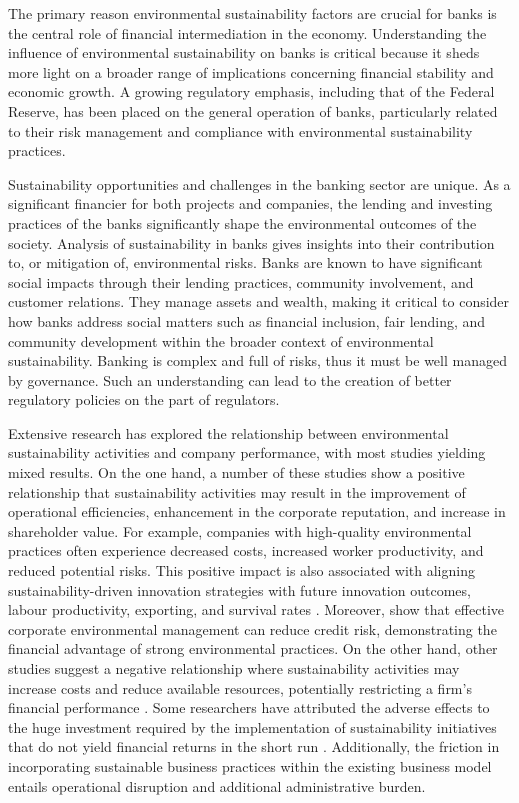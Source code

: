 \documentclass[11pt, a4paper]{article}
\begin{document}
The primary reason environmental sustainability factors are crucial for banks is the central role of financial intermediation in the economy. Understanding the influence of environmental sustainability on banks is critical because it sheds more light on a broader range of implications concerning financial stability and economic growth. A growing regulatory emphasis, including that of the Federal Reserve, has been placed on the general operation of banks, particularly related to their risk management and compliance with environmental sustainability practices.

Sustainability opportunities and challenges in the banking sector are unique. As a significant financier for both projects and companies, the lending and investing practices of the banks significantly shape the environmental outcomes of the society. Analysis of sustainability in banks gives insights into their contribution to, or mitigation of, environmental risks. Banks are known to have significant social impacts through their lending practices, community involvement, and customer relations. They manage assets and wealth, making it critical to consider how banks address social matters such as financial inclusion, fair lending, and community development within the broader context of environmental sustainability. Banking is complex and full of risks, thus it must be well managed by governance. Such an understanding can lead to the creation of better regulatory policies on the part of regulators.

Extensive research has explored the relationship between environmental sustainability activities and company performance, with most studies yielding mixed results. On the one hand, a number of these studies show a positive relationship that sustainability activities may result in the improvement of operational efficiencies, enhancement in the corporate reputation, and increase in shareholder value. For example, companies with high-quality environmental practices often experience decreased costs, increased worker productivity, and reduced potential risks. This positive impact is also associated with aligning sustainability-driven innovation strategies with future innovation outcomes, labour productivity, exporting, and survival rates \citep{Cabaleiro2024}. Moreover, \cite{Bauer2014} show that effective corporate environmental management can reduce credit risk, demonstrating the financial advantage of strong environmental practices. On the other hand, other studies suggest a negative relationship where sustainability activities may increase costs and reduce available resources, potentially restricting a firm's financial performance \citep{Hwang2021}. Some researchers have attributed the adverse effects to the huge investment required by the implementation of sustainability initiatives that do not yield financial returns in the short run \citep{Khan2023a}. Additionally, the friction in incorporating sustainable business practices within the existing business model entails operational disruption and additional administrative burden. 
\end{document}
